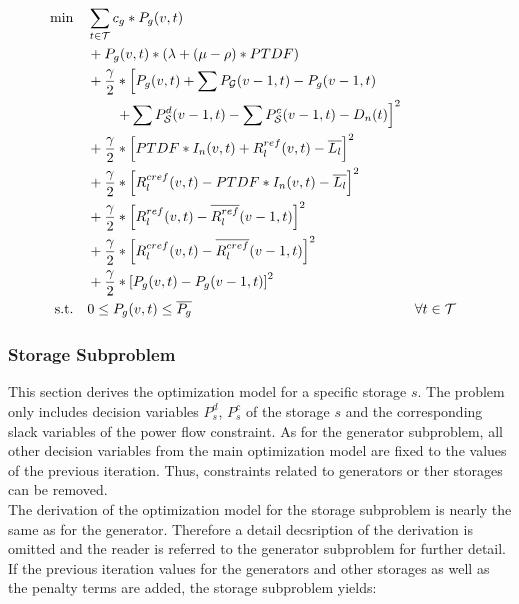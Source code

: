  \begin{subequations}
	\begin{align}
		 \min \quad & \sum_{t\in\mathcal{T}} c_g*P_g(v, t) \label{eq:sub:gen-final}\\
		 & + P_g(v, t) * (\lambda + (\mu - \rho) * PTDF) \nonumber \\ 
		 & + \frac{\gamma}{2} * \left[P_g(v, t) + \sum P_{\mathcal{G}}(v-1,t) - P_g(v-1, t) \right. \nonumber \\
		 & \qquad \left. + \sum P_{\mathcal{S}}^d(v-1, t) - \sum P_{\mathcal{S}}^c(v-1, t) - D_n(t)\right]^2 \nonumber \\
		 & + \frac{\gamma}{2} * \left[PTDF * I_n(v, t) + R^{ref}_l(v, t) - \overline{L_l}\right]^2 \nonumber \\
		 & + \frac{\gamma}{2} * \left[R^{cref}_l(v, t) - PTDF * I_n(v, t) - \overline{L_l}\right]^2\nonumber \\
		 & + \frac{\gamma}{2} * \left[R^{ref}_l(v, t) - \overline{R^{ref}_l}(v-1, t)  \right]^2 \nonumber\\
		 & + \frac{\gamma}{2} * \left[R^{cref}_l(v, t) - \overline{R^{cref}_l}(v-1, t)  \right]^2 \nonumber \\
		 & + \frac{\gamma}{2} * \left[P_g(v, t) - P_g(v-1, t)\right]^2 \nonumber \\
		 \text{s.t.} \quad & 0 \leq P_g(v, t) \leq \overline{P_g} && \forall t \in \mathcal{T}
	\end{align}
\end{subequations}

\subsubsection*{Storage Subproblem}

This section derives the optimization model for a specific storage $s$. The problem only includes decision variables $P_{s}^d$, $P_{s}^c$ of the storage $s$ and the corresponding slack variables of the power flow constraint. As for the generator subproblem, all other decision variables from the main optimization model are fixed to the values of the previous iteration. Thus, constraints related to generators or ther storages can be removed. \\

The derivation of the optimization model for the storage subproblem is nearly the same as for the generator. Therefore a detail decsription of the derivation is omitted and the reader is referred to the generator subproblem for further detail. If the previous iteration values for the generators and other storages as well as the penalty terms are added, the storage subproblem yields:

